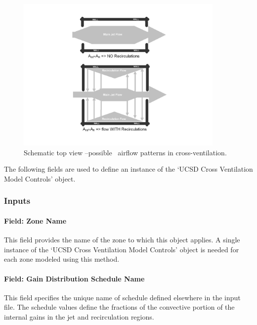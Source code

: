 \begin{figure}[hbtp] %
\centering
\includegraphics[width=0.9\textwidth, height=0.9\textheight, keepaspectratio=true]{media/image082.png}
\caption{Schematic top view –possible  airflow patterns in cross-ventilation. \protect \label{fig:schematic-top-view-possible-airflow-patterns}}
\end{figure}

The following fields are used to define an instance of the `UCSD Cross Ventilation Model Controls' object.

\subsubsection{Inputs}\label{inputs-9-018}

\paragraph{Field: Zone Name}\label{field-zone-name-5-004}

This field provides the name of the zone to which this object applies. A single instance of the `UCSD Cross Ventilation Model Controls' object is needed for each zone modeled using this method.

\paragraph{Field: Gain Distribution Schedule Name}\label{field-gain-distribution-schedule-name-1}

This field specifies the unique name of schedule defined elsewhere in the input file. The schedule values define the fractions of the convective portion of the internal gains in the jet and recirculation regions.

